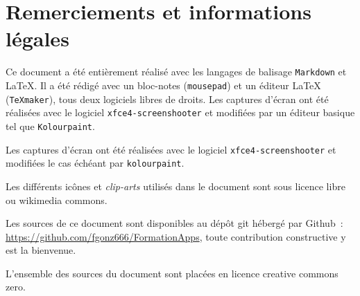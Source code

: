 \chapter{Remerciements et informations légales}

Ce document a été entièrement réalisé avec les langages de balisage \texttt{Markdown} et \LaTeX{}. 
Il a été rédigé avec un bloc-notes (\texttt{mousepad}) et un éditeur \LaTeX{} (\texttt{\TeX{}maker}), tous deux logiciels libres de droits.
Les captures d'écran ont été réalisées avec le logiciel \texttt{xfce4-screenshooter} et modifiées par un éditeur basique tel que \texttt{Kolourpaint}.

Les captures d'écran ont été réalisées avec le logiciel \texttt{xfce4-screenshooter} et modifiées le cas échéant par \texttt{kolourpaint}.

Les différents icônes et \emph{clip-arts\/} utilisés dans le document sont sous licence libre ou wikimedia commons.

Les sources de ce document sont disponibles au dépôt git hébergé par Github~: \url{https://github.com/fgonz666/FormationApps}, toute contribution constructive y est la bienvenue.

L'ensemble des sources du document sont placées en licence creative commons zero.